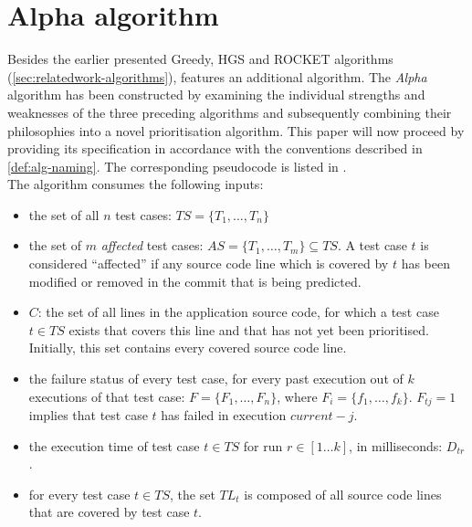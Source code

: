 
\section{Alpha algorithm}
\label{sec:velocity-alpha}

Besides the earlier presented Greedy, HGS and ROCKET algorithms (\cref{sec:relatedwork-algorithms}), \velocity{} features an additional algorithm. The \emph{Alpha} algorithm has been constructed by examining the individual strengths and weaknesses of the three preceding algorithms and subsequently combining their philosophies into a novel prioritisation algorithm. This paper will now proceed by providing its specification in accordance with the conventions described in \cref{def:alg-naming}. The corresponding pseudocode is listed in .\\

\noindent The algorithm consumes the following inputs:
\begin{itemize}
	\item the set of all $n$ test cases: $TS = \{T_1, \dots, T_n\}$
	
	\item the set of $m$ \emph{affected} test cases: $AS = \{T_1, \dots, T_m\} \subseteq TS$. A test case $t$ is considered ``affected'' if any source code line which is covered by $t$ has been modified or removed in the commit that is being predicted.
	
	\item $C$: the set of all lines in the application source code, for which a test case $t \in TS$ exists that covers this line and that has not yet been prioritised. Initially, this set contains every covered source code line.
	
	\item the failure status of every test case, for every past execution out of $k$ executions of that test case: $F = \{F_1, \dots, F_n\}$, where $F_i = \{f_1, \dots, f_k\}$. $F_{tj} = 1$ implies that test case $t$ has failed in execution $current - j$.
	
	\item the execution time of test case $t \in TS$ for run $r \in [1 \dots k]$, in milliseconds: $D_{tr}$.
	
	\item for every test case $t \in TS$, the set $TL_t$ is composed of all source code lines that are covered by test case $t$.
\end{itemize}

